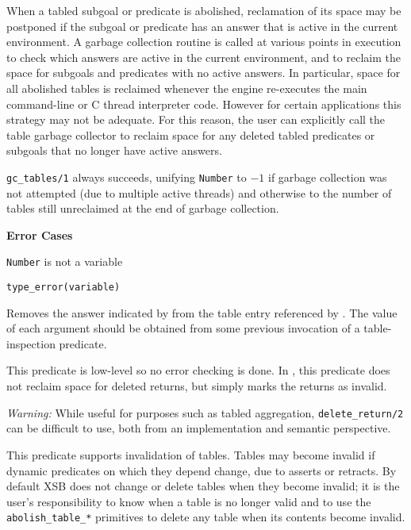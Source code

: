 \begin{description}
\begin{description}

%
When a tabled subgoal or predicate is abolished, reclamation of its
space may be postponed if the subgoal or predicate has an answer that
is active in the current environment.  A garbage collection routine is
called at various points in execution to check which answers are
active in the current environment, and to reclaim the space for
subgoals and predicates with no active answers.  In particular, space
for all abolished tables is reclaimed whenever the engine re-executes
the main command-line or C thread interpreter code.  However for
certain applications this strategy may not be adequate.  For this
reason, the user can explicitly call the table garbage collector
to reclaim space for any deleted tabled predicates or subgoals that no
longer have active answers.

{\tt gc\_tables/1} always succeeds, unifying {\tt Number} to $-1$ if
garbage collection was not attempted (due to multiple active threads)
and otherwise to the number of tables still unreclaimed at the end of
garbage collection.

{\bf Error Cases}
\bi
\item {\tt Number} is not a variable
\bi
\item 	{\tt type\_error(variable)}
\ei
\ei


%
Removes the answer indicated by  from the table
entry referenced by .  The value of each
argument should be obtained from some previous invocation of a
table-inspection predicate.

This predicate is low-level so no error checking is done.  In \version
, this predicate does not reclaim space for deleted returns, but
simply marks the returns as invalid.

{\em Warning: } While useful for purposes such as tabled aggregation,
{\tt delete\_return/2} can be difficult to use, both from an
implementation and semantic perspective.  


%
This predicate supports invalidation of tables.  Tables may become
invalid if dynamic predicates on which they depend change, due to
asserts or retracts.  By default XSB does not change or delete tables
when they become invalid; it is the user's responsibility to know when
a table is no longer valid and to use the {\tt abolish\_table\_*}
primitives to delete any table when its contents become invalid.


\end{description}
\end{description}

